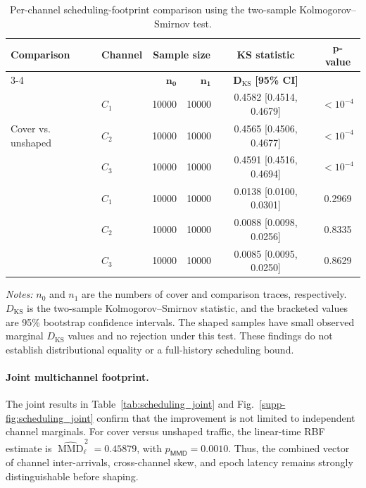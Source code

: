 \documentclass[journal]{IEEEtran}
\renewcommand{\arraystretch}{1.2}
\renewcommand{\arraystretch}{1.0}
\theoremstyle{definition}
\theoremstyle{game}
\renewcommand{\arraystretch}{1.5}
\begin{document}
\begin{table}[!t]
\centering
\caption[Per-channel scheduling-footprint comparison.]
{Per-channel scheduling-footprint comparison using the two-sample Kolmogorov--Smirnov test.}
\label{tab:scheduling_ks}
\small
\setlength{\tabcolsep}{6.0pt}
\renewcommand{\arraystretch}{1.15}
\begin{threeparttable}
\begin{tabular}{@{}llrrcc@{}}
\toprule
\textbf{Comparison} &
\textbf{Channel} &
\multicolumn{2}{c}{\textbf{Sample size}} &
\textbf{KS statistic} &
$\boldsymbol{p}$\textbf{-value} \\
\cmidrule(lr){3-4}
& & $\boldsymbol{n_0}$ & $\boldsymbol{n_1}$
& $\boldsymbol{D_{\mathrm{KS}}}$ \textbf{[95\% CI]} & \\
\midrule
\multirow{3}{*}{Cover vs. unshaped}
& $C_1$ & 10000 & 10000 & 0.4582 [0.4514, 0.4679] & $<10^{-4}$ \\
& $C_2$ & 10000 & 10000 & 0.4565 [0.4506, 0.4677] & $<10^{-4}$ \\
& $C_3$ & 10000 & 10000 & 0.4591 [0.4516, 0.4694] & $<10^{-4}$ \\
\addlinespace[2pt]
\multirow{3}{*}{Cover vs. shaped}
& $C_1$ & 10000 & 10000 & 0.0138 [0.0100, 0.0301] & 0.2969 \\
& $C_2$ & 10000 & 10000 & 0.0088 [0.0098, 0.0256] & 0.8335 \\
& $C_3$ & 10000 & 10000 & 0.0085 [0.0095, 0.0250] & 0.8629 \\
\bottomrule
\end{tabular}
\begin{tablenotes}
\footnotesize
\item \textit{Notes:} $n_0$ and $n_1$ are the numbers of cover and comparison traces, respectively. $D_{\mathrm{KS}}$ is the two-sample Kolmogorov--Smirnov statistic, and the bracketed values are 95\% bootstrap confidence intervals. The shaped samples have small observed marginal $D_{\mathrm{KS}}$ values and no rejection under this test. These findings do not establish distributional equality or a full-history scheduling bound.
\end{tablenotes}
\end{threeparttable}
\end{table}

\paragraph{Joint multichannel footprint.}
The joint results in Table~\ref{tab:scheduling_joint} and
Fig.~\ref{supp-fig:scheduling_joint} confirm that the improvement is not
limited to independent channel marginals. For cover versus unshaped
traffic, the linear-time RBF estimate is
$\widehat{\operatorname{MMD}}_{\ell}^{\,2}=0.45879$, with
$p_{\mathsf{MMD}}=0.0010$. Thus, the combined vector of channel
inter-arrivals, cross-channel skew, and epoch latency remains strongly
distinguishable before shaping.
\end{document}
